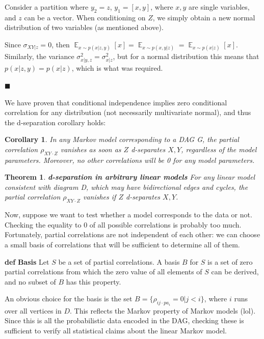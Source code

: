 \documentclass[fleqn]{article}
\DeclareMathOperator{\E}{\mathop\mathbb{E}}
\def\define#1{\textbf{def} \textbf{#1}}
\newtheorem{theorem}{Theorem}
\newtheorem{corollary}{Corollary}
\numberwithin{equation}{section}
\numberwithin{theorem}{section}
\numberwithin{figure}{section}
\numberwithin{lemma}{section}
\numberwithin{corollary}{section}
\begin{document}
Consider a partition where $y_2 = z$, $y_1 = [x,y]$, where $x,y$ are single variables, and $z$ can be a vector. When conditioning on $Z$, we simply obtain a new normal distribution of two variables (as mentioned above).

Since $\sigma_{XY|z} = 0$, then $\E_{x \sim p(x|z,y)} [x] = \E_{x \sim p(x,y|z)} = \E_{x \sim p(x|z)} [x]$. Similarly, the variance $\sigma^2_{x|y,z} = \sigma^2_{x|z}$, but for a normal distribution this means that $p(x|z,y) = p(x|z)$, which is what was required.

$\blacksquare$

We have proven that conditional independence implies zero conditional correlation for any distribution (not necessarily multivariate normal), and thus the d-separation corollary holds:

\begin{corollary}
	In any Markov model corresponding to a DAG G, the partial correlation $\rho_{XY\cdot Z}$ vanishes as soon as $Z$ d-separates $X,Y$, regardless of the model parameters. Moreover, no other correlations will be 0 for any model parameters.
\end{corollary}

\begin{theorem}
	\textbf{d-separation in arbitrary linear models} For any linear model consistent with diagram D, which may have bidirectional edges and cycles, the partial correlation $\rho_{XY\cdot Z}$ vanishes if $Z$ d-separates $X,Y$. 
\end{theorem}

Now, suppose we want to test whether a model corresponds to the data or not. Checking the equality to 0 of all possible correlations is probably too much. Fortunately, partial correlations are not independent of each other: we can choose a small basis of correlations that will be sufficient to determine all of them.

\define{Basis} Let $S$ be a set of partial correlations. A basis $B$ for $S$ is a set of zero partial correlations from which the zero value of all elements of $S$ can be derived, and no subset of $B$ has this property.

An obvious choice for the basis is the set $B = \{\rho_{ij\cdot pa_i} = 0| j < i\}$, where $i$ runs over all vertices in $D$. This reflects the Markov property of Markov models (lol). Since this is all the probabilistic data encoded in the DAG, checking these is sufficient to verify all statistical claims about the linear Markov model.
\end{document}
